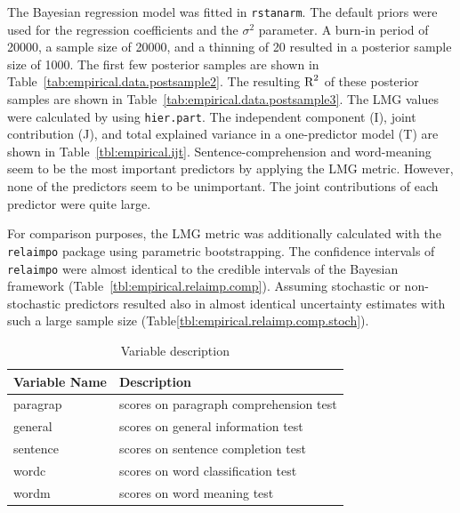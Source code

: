 \documentclass[11pt,a4paper,twoside]{book}\usepackage[]{graphicx}\usepackage[]{color}
\begin{document}
The Bayesian regression model was fitted in \texttt{rstanarm}. The default priors were used for the regression coefficients and the $\sigma^2$ parameter. A burn-in period of 20000, a sample size of 20000, and a thinning of 20 resulted in a posterior sample size of 1000. The first few posterior samples are shown in Table~\ref{tab:empirical.data.postsample2}. The resulting $\text{R}^2$ of these posterior samples are shown in Table~\ref{tab:empirical.data.postsample3}. The LMG values were calculated by using \texttt{hier.part}. The  independent component (I), joint contribution (J), and total explained variance in a one-predictor model (T) are shown in Table~\ref{tbl:empirical.ijt}. Sentence-comprehension and word-meaning seem to be the most important predictors by applying the LMG metric. However, none of the predictors seem to be unimportant.  The joint contributions of each predictor were quite large.

For comparison purposes, the LMG metric was additionally calculated with the \texttt{relaimpo} package using parametric bootstrapping. The confidence intervals of  \texttt{relaimpo} were almost identical to the credible intervals of the Bayesian framework (Table~\ref{tbl:empirical.relaimp.comp}). Assuming stochastic or non-stochastic predictors resulted also in almost identical uncertainty estimates with such a large sample size (Table\ref{tbl:empirical.relaimp.comp.stoch}). 







\begin{table}
\centering
\caption{Variable description}
\begin{tabular}{l l}
  \toprule			
  Variable Name & Description  \\   \midrule  
  paragrap & scores on paragraph comprehension test  \\
  general & scores on general information test \\
  sentence & scores on sentence completion test\\
  wordc & scores on word classification test \\
  wordm & scores on word meaning test \\
  \bottomrule  
\end{tabular}
\label{table:hs.data}
\end{table}
\end{document}
